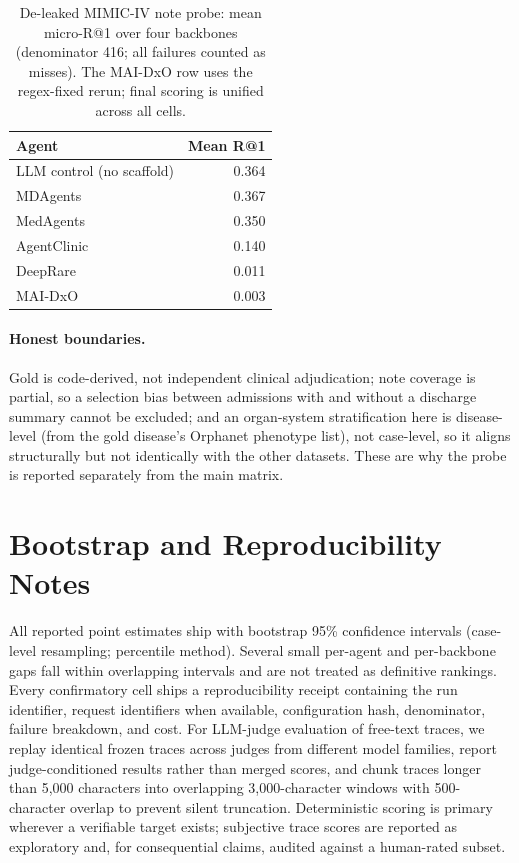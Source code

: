 \documentclass[letterpaper]{article} %
\begin{document}
\begin{table}[h]
\centering
\scriptsize
\setlength{\tabcolsep}{5pt}
\caption{De-leaked MIMIC-IV note probe: mean micro-R@1 over four backbones
(denominator 416; all failures counted as misses). The MAI-DxO row uses the
regex-fixed rerun; final scoring is unified across all cells.}
\label{tab:mimicmatrix}
\begin{tabular}{@{}lr@{}}
\toprule
Agent & Mean R@1 \\
\midrule
LLM control (no scaffold) & 0.364 \\
MDAgents & 0.367 \\
MedAgents & 0.350 \\
AgentClinic & 0.140 \\
DeepRare & 0.011 \\
MAI-DxO & 0.003 \\
\bottomrule
\end{tabular}
\end{table}

\paragraph{Honest boundaries.}
Gold is code-derived, not independent clinical adjudication; note coverage is
partial, so a selection bias between admissions with and without a discharge
summary cannot be excluded; and an organ-system stratification here is
disease-level (from the gold disease's Orphanet phenotype list), not
case-level, so it aligns structurally but not identically with the other
datasets. These are why the probe is reported separately from the main matrix.

\section{Bootstrap and Reproducibility Notes}
\label{app:repro-notes}

All reported point estimates ship with bootstrap 95\% confidence intervals
(case-level resampling; percentile method). Several small per-agent and
per-backbone gaps fall within overlapping intervals and are not treated as
definitive rankings. Every confirmatory cell ships a reproducibility receipt
containing the run identifier, request identifiers when available, configuration
hash, denominator, failure breakdown, and cost. For LLM-judge evaluation of
free-text traces, we replay identical frozen traces across judges from different
model families, report judge-conditioned results rather than merged scores, and
chunk traces longer than 5,000 characters into overlapping 3,000-character
windows with 500-character overlap to prevent silent truncation. Deterministic
scoring is primary wherever a verifiable target exists; subjective trace scores
are reported as exploratory and, for consequential claims, audited against a
human-rated subset.
\end{document}
